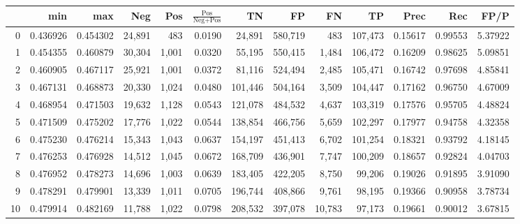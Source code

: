 \begin{tabular}{rrrrrrrrrrrrr}
\toprule
{} &       min &       max &     Neg &    Pos & $\frac{\text{Pos}}{\text{Neg}+\text{Pos}}$ &       TN &       FP &       FN &       TP &     Prec &      Rec &     FP/P \\
\midrule
0  &  0.436926 &  0.454302 &  24,891 &    483 &                                     0.0190 &   24,891 &  580,719 &      483 &  107,473 &  0.15617 &  0.99553 &  5.37922 \\
1  &  0.454355 &  0.460879 &  30,304 &  1,001 &                                     0.0320 &   55,195 &  550,415 &    1,484 &  106,472 &  0.16209 &  0.98625 &  5.09851 \\
2  &  0.460905 &  0.467117 &  25,921 &  1,001 &                                     0.0372 &   81,116 &  524,494 &    2,485 &  105,471 &  0.16742 &  0.97698 &  4.85841 \\
3  &  0.467131 &  0.468873 &  20,330 &  1,024 &                                     0.0480 &  101,446 &  504,164 &    3,509 &  104,447 &  0.17162 &  0.96750 &  4.67009 \\
4  &  0.468954 &  0.471503 &  19,632 &  1,128 &                                     0.0543 &  121,078 &  484,532 &    4,637 &  103,319 &  0.17576 &  0.95705 &  4.48824 \\
5  &  0.471509 &  0.475202 &  17,776 &  1,022 &                                     0.0544 &  138,854 &  466,756 &    5,659 &  102,297 &  0.17977 &  0.94758 &  4.32358 \\
6  &  0.475230 &  0.476214 &  15,343 &  1,043 &                                     0.0637 &  154,197 &  451,413 &    6,702 &  101,254 &  0.18321 &  0.93792 &  4.18145 \\
7  &  0.476253 &  0.476928 &  14,512 &  1,045 &                                     0.0672 &  168,709 &  436,901 &    7,747 &  100,209 &  0.18657 &  0.92824 &  4.04703 \\
8  &  0.476952 &  0.478273 &  14,696 &  1,003 &                                     0.0639 &  183,405 &  422,205 &    8,750 &   99,206 &  0.19026 &  0.91895 &  3.91090 \\
9  &  0.478291 &  0.479901 &  13,339 &  1,011 &                                     0.0705 &  196,744 &  408,866 &    9,761 &   98,195 &  0.19366 &  0.90958 &  3.78734 \\
10 &  0.479914 &  0.482169 &  11,788 &  1,022 &                                     0.0798 &  208,532 &  397,078 &   10,783 &   97,173 &  0.19661 &  0.90012 &  3.67815 \\

\end{tabular}

